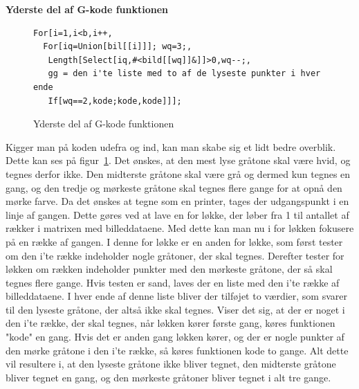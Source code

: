 \textbf{Yderste del af G-kode funktionen}\\
\begin{figure}[h]
	\begin{lstlisting}
For[i=1,i<b,i++,
  For[iq=Union[bil[[i]]]; wq=3;, 
   Length[Select[iq,#<bild[[wq]]&]]>0,wq--;,
   gg = den i'te liste med to af de lyseste punkter i hver ende
   If[wq==2,kode;kode,kode]]];
 \end{lstlisting}
	\caption{Yderste del af G-kode funktionen}
	\label{fig:ydregkode1}
	\end{figure}
Kigger man på koden udefra og ind, kan man skabe sig et lidt bedre overblik. Dette kan ses på figur~\ref{fig:ydregkode1}. Det ønskes, at den mest lyse gråtone skal være hvid, og tegnes derfor ikke. Den midterste gråtone skal være grå og dermed kun tegnes en gang, og den tredje og mørkeste gråtone skal tegnes flere gange for at opnå den mørke farve. Da det ønskes at tegne som en printer, tages der udgangspunkt i en linje af gangen. Dette gøres ved at lave en for løkke, der løber fra 1 til antallet af rækker i matrixen med billeddataene. Med dette kan man nu i for løkken fokusere på en række af gangen. I denne for løkke er en anden for løkke, som først tester om den i'te række indeholder nogle gråtoner, der skal tegnes. Derefter tester for løkken om rækken indeholder punkter med den mørkeste gråtone, der så skal tegnes flere gange. Hvis testen er sand, laves der en liste med den i'te række af billeddataene. I hver ende af denne liste bliver der tilføjet to værdier, som svarer til den lyseste gråtone, der altså ikke skal tegnes. Viser det sig, at der er noget i den i'te række, der skal tegnes, når løkken kører første gang, køres funktionen "kode" en gang. Hvis det er anden gang løkken kører, og der er nogle punkter af den mørke gråtone i den i'te række, så køres funktionen kode to gange. Alt dette vil resultere i, at den lyseste gråtone ikke bliver tegnet, den midterste gråtone bliver tegnet en gang, og den mørkeste gråtoner bliver tegnet i alt tre gange.

